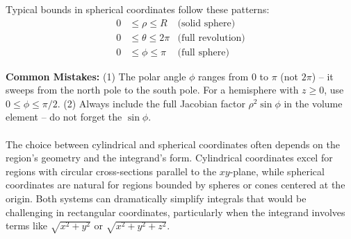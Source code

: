 \noindent Typical bounds in spherical coordinates follow these patterns:
\begin{align*}
0 &\leq \rho \leq R & \text{(solid sphere)} \\
0 &\leq \theta \leq 2\pi & \text{(full revolution)} \\
0 &\leq \phi \leq \pi & \text{(full sphere)}
\end{align*}

\noindent \textbf{Common Mistakes:} (1) The polar angle \( \phi \) ranges from \( 0 \) to \( \pi \) (not \( 2\pi \)) -- it sweeps from the north pole to the south pole. For a hemisphere with \( z \geq 0 \), use \( 0 \leq \phi \leq \pi/2 \). (2) Always include the full Jacobian factor \( \rho^2 \sin\phi \) in the volume element -- do not forget the \( \sin\phi \).\\ \\

\noindent The choice between cylindrical and spherical coordinates often depends on the region's geometry and the integrand's form. Cylindrical coordinates excel for regions with circular cross-sections parallel to the $xy$-plane, while spherical coordinates are natural for regions bounded by spheres or cones centered at the origin. Both systems can dramatically simplify integrals that would be challenging in rectangular coordinates, particularly when the integrand involves terms like $\sqrt{x^2 + y^2}$ or $\sqrt{x^2 + y^2 + z^2}$.


